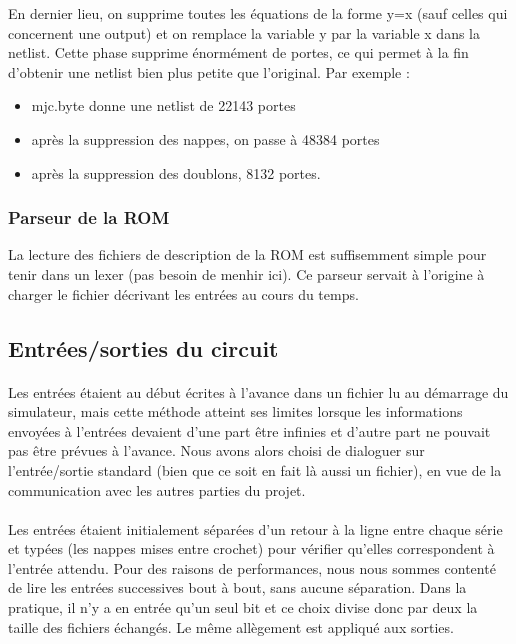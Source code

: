 \documentclass{article}
\begin{document}
En   dernier lieu, on supprime  toutes les équations de la forme y=x (sauf  celles qui concernent une  output) et on remplace la variable y par la  variable x dans la netlist. Cette phase supprime énormément de portes, ce qui permet à la fin d'obtenir une netlist bien plus petite que l'original. Par exemple :
\begin{itemize}
	\item mjc.byte donne une netlist de 22143 portes
	\item après la suppression des nappes, on passe à 48384 portes
	\item après la suppression des doublons, 8132 portes.
\end{itemize}


\subsubsection{Parseur de la ROM}
La lecture des fichiers de description de la ROM est suffisemment simple pour tenir dans un lexer (pas besoin de menhir ici). Ce parseur servait à l'origine à charger le fichier décrivant les entrées au cours du temps.

\subsection{Entrées/sorties du circuit}
\paragraph{}Les entrées étaient au début écrites à l'avance dans un fichier lu au démarrage du simulateur, mais cette méthode atteint ses limites lorsque les informations envoyées à l'entrées devaient d'une part être infinies et d'autre part ne pouvait pas être prévues à l'avance. Nous avons alors choisi de dialoguer sur l'entrée/sortie standard (bien que ce soit en fait là aussi un fichier), en vue de la communication avec les autres parties du projet.

\paragraph{}Les entrées étaient initialement séparées d'un retour à la ligne entre chaque série et typées (les nappes mises entre crochet) pour vérifier qu'elles correspondent à l'entrée attendu. Pour des raisons de performances, nous nous sommes contenté de lire les entrées successives bout à bout, sans aucune séparation. Dans la pratique, il n'y a en entrée qu'un seul bit et ce choix divise donc par deux la taille des fichiers échangés. Le même allègement est appliqué aux sorties.
\end{document}
